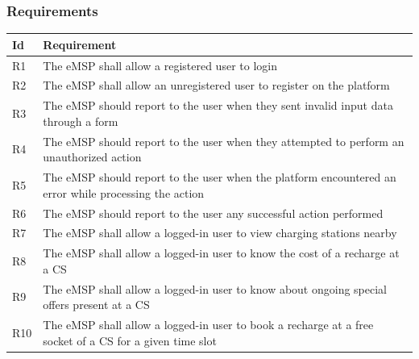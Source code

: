 \documentclass[11pt]{article}
\begin{document}
\newpage

\subsubsection{Requirements}

\begin{table}[H]
    \centering
    \setlength{\tabcolsep}{18pt}
    \renewcommand{\arraystretch}{1.2}
    \begin{tabularx}{\textwidth}{|>{\centering\hsize=0.1\hsize}X|>{\hsize=1.9\hsize}X|}
        \hline
        \textbf{Id} & \textbf{Requirement} \\
        \hline
        R1 & The eMSP shall allow a registered user to login \\
        \hline
        R2 & The eMSP shall allow an unregistered user to register on the platform \\
        \hline
        R3 & The eMSP should report to the user when they sent invalid input data through a form \\
        \hline
        R4 & The eMSP should report to the user when they attempted to perform an unauthorized action \\
        \hline
        R5 & The eMSP should report to the user when the platform encountered an error while processing the action \\
        \hline
        R6 & The eMSP should report to the user any successful action performed \\
        \hline
        R7 & The eMSP shall allow a logged-in user to view charging stations nearby \\
        \hline
        R8 & The eMSP shall allow a logged-in user to know the cost of a recharge at a CS \\
        \hline
        R9 & The eMSP shall allow a logged-in user to know about ongoing special offers present at a CS \\
        \hline
        R10 & The eMSP shall allow a logged-in user to book a recharge at a free socket of a CS for a given time slot \\
        \hline

\end{tabularx}
\end{table}
\end{document}
